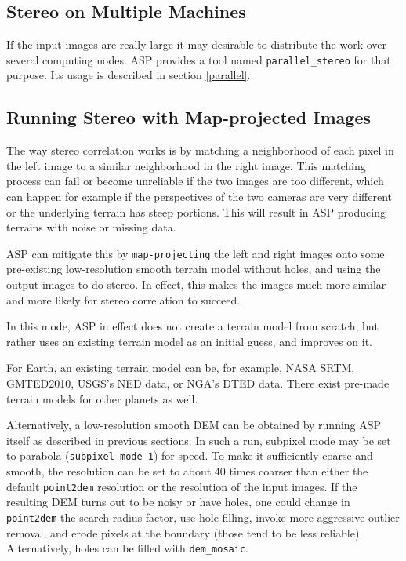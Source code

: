 \subsection{Stereo on Multiple Machines}

If the input images are really large it may desirable to distribute the
work over several computing nodes. ASP provides a tool named
\texttt{parallel\_stereo} for that purpose. Its usage is described in section
\ref{parallel}.

\subsection{Running Stereo with Map-projected Images}
\label{mapproj-example}

The way stereo correlation works is by matching a neighborhood of each
pixel in the left image to a similar neighborhood in the right image.
This matching process can fail or become unreliable if the two images
are too different, which can happen for example if the perspectives
of the two cameras are very different or the underlying terrain has
steep portions. This will result in ASP producing terrains with noise or
missing data.

ASP can mitigate this by \texttt{map-projecting} the left and right
images onto some pre-existing low-resolution smooth terrain model
without holes, and using the output images to do stereo. In effect, this
makes the images much more similar and more likely for stereo
correlation to succeed.

In this mode, ASP in effect does not create a terrain model from scratch,
but rather uses an existing terrain model as an initial guess, and
improves on it.

For Earth, an existing terrain model can be, for example, NASA SRTM,
GMTED2010, USGS's NED data, or NGA's DTED data. There exist pre-made
terrain models for other planets as well.

Alternatively, a low-resolution smooth DEM can be obtained by running
ASP itself as described in previous sections. In such a run, subpixel
mode may be set to parabola (\texttt{subpixel-mode 1}) for speed. To
make it sufficiently coarse and smooth, the resolution can be set to
about 40 times coarser than either the default \texttt{point2dem}
resolution or the resolution of the input images. If the resulting DEM
turns out to be noisy or have holes, one could change in
\texttt{point2dem} the search radius factor, use hole-filling, invoke more
aggressive outlier removal, and erode pixels at the boundary (those
tend to be less reliable). Alternatively, holes can be filled with
\texttt{dem\_mosaic}.

